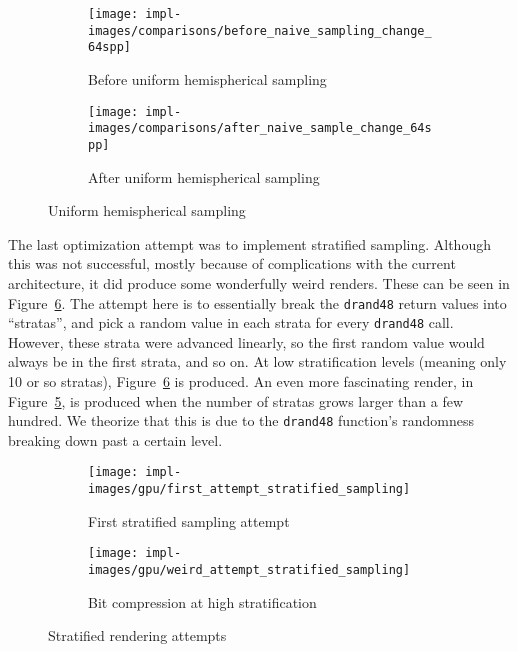 \vspace{0.3em}
\begin{figure}[htb]
  \centering
  \begin{subfigure}[htb]{0.45\textwidth}
    \texttt{[image: impl-images/comparisons/before\_naive\_sampling\_change\_64spp]}
    \caption{Before uniform hemispherical sampling}
\label{fig:rayterm-gpu_hemispherical_sampling_before}
  \end{subfigure}
  \begin{subfigure}[htb]{0.45\textwidth}
    \texttt{[image: impl-images/comparisons/after\_naive\_sample\_change\_64spp]}
    \caption{After uniform hemispherical sampling}
\label{fig:rayterm-gpu_hemispherical_sampling_after}
  \end{subfigure}
  \caption{Uniform hemispherical sampling}
\label{fig:rayterm-gpu_hemispherical_sampling}
\end{figure}

The last optimization attempt was to implement stratified sampling.
Although this was not successful, mostly because of complications with the current architecture, it did produce some wonderfully weird renders.
These can be seen in Figure~\ref{fig:rayterm-gpu_stratified}.
The attempt here is to essentially break the \texttt{drand48} return values into ``stratas'', and pick a random value in each strata for every \texttt{drand48} call.
However, these strata were advanced linearly, so the first random value would always be in the first strata, and so on.
At low stratification levels (meaning only 10 or so stratas), Figure~\ref{fig:rayterm-gpu_stratified} is produced.
An even more fascinating render, in Figure~\ref{fig:rayterm-gpu_bit_compression}, is produced when the number of stratas grows larger than a few hundred.
We theorize that this is due to the \texttt{drand48} function's randomness breaking down past a certain level.

\vspace{0.3em}
\begin{figure}[htb]
  \centering
  \begin{subfigure}[htb]{0.45\textwidth}
    \texttt{[image: impl-images/gpu/first\_attempt\_stratified\_sampling]}
    \caption{First stratified sampling attempt}
\label{fig:rayterm-gpu_stratified}
  \end{subfigure}
  \begin{subfigure}[htb]{0.45\textwidth}
    \texttt{[image: impl-images/gpu/weird\_attempt\_stratified\_sampling]}
    \caption{Bit compression at high stratification}
\label{fig:rayterm-gpu_bit_compression}
  \end{subfigure}
  \caption{Stratified rendering attempts}
\label{fig:rayterm-gpu_stratified}
\end{figure}

